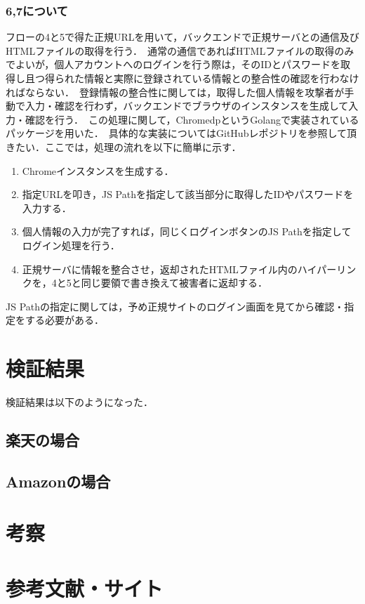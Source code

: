 \documentclass[dvipdfmx]{jsarticle}
\begin{document}
    \subsubsection{6,7について}
    フローの4と5で得た正規URLを用いて，バックエンドで正規サーバとの通信及びHTMLファイルの取得を行う．\
    通常の通信であればHTMLファイルの取得のみでよいが，個人アカウントへのログインを行う際は，そのIDとパスワードを取得し且つ得られた情報と実際に登録されている情報との整合性の確認を行わなければならない．\
    登録情報の整合性に関しては，取得した個人情報を攻撃者が手動で入力・確認を行わず，バックエンドでブラウザのインスタンスを生成して入力・確認を行う．\
    この処理に関して，ChromedpというGolangで実装されているパッケージを用いた．\
    具体的な実装についてはGitHubレポジトリを参照して頂きたい．ここでは，処理の流れを以下に簡単に示す．
    \begin{enumerate}
        \item Chromeインスタンスを生成する．
        \item 指定URLを叩き，JS Pathを指定して該当部分に取得したIDやパスワードを入力する．
        \item 個人情報の入力が完了すれば，同じくログインボタンのJS Pathを指定してログイン処理を行う．
        \item 正規サーバに情報を整合させ，返却されたHTMLファイル内のハイパーリンクを，4と5と同じ要領で書き換えて被害者に返却する．
    \end{enumerate}
    JS Pathの指定に関しては，予め正規サイトのログイン画面を見てから確認・指定をする必要がある．
    \section{検証結果}
    検証結果は以下のようになった．
    \subsection{楽天の場合}

    \subsection{Amazonの場合}

    \section{考察}
    
    \section{参考文献・サイト}
\end{document}

